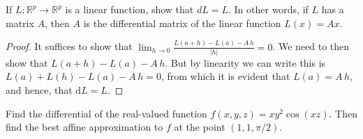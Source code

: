 \documentclass[12pt]{book}
\newcommand{\R}{\mathbb{R}}
\newenvironment{exercise}[2][Exercise]{\begin{trivlist}
\item[\hskip \labelsep {\bfseries #1}\hskip \labelsep {\bfseries #2.}]}{\end{trivlist}}
\begin{document}
\begin{exercise}{9.2.1}
	If $L: \R^p \to \R^p$ is a linear function, show that $dL=L$. In other words, if $L$ has a matrix $A$, then $A$ is the differential matrix of the linear function $L(x)=A x$.

	\begin{proof}
    It suffices to show that $\lim_{h \to 0} \frac{L(a+h)-L(a)-A\,h}{|h|}=0$. We need to then show that $L(a+h)-L(a)-A\,h$. But by linearity we can write this is $L(a)+L(h)-L(a)-A\,h =0 $, from which it is evident that $L(a)=A\,h$, and hence, that $\text{d}L=L$.
	\end{proof}
\end{exercise}


\begin{exercise}{9.2.5}
	Find the differential of the real-valued function $f(x,y,z) = x y^2 \cos(x z)$. Then find the best affine approximation to $f$ at the point $(1, 1, \pi/2)$. \\
	

\end{exercise}
\end{document}
